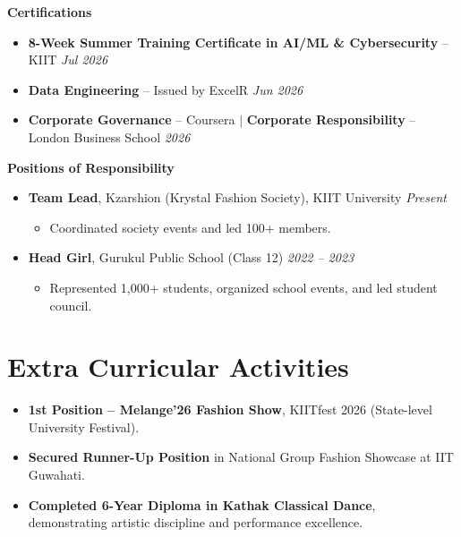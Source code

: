 \documentclass[a4paper,10pt]{article}
\begin{document}
\noindent\textbf{Certifications}
\begin{itemize}
    \item \textbf{8-Week Summer Training Certificate in AI/ML \& Cybersecurity} -- KIIT \hfill \textit{Jul 2026}
    \item \textbf{Data Engineering} -- Issued by ExcelR \hfill \textit{Jun 2026}
    \item \textbf{Corporate Governance} -- Coursera \quad $|$ \quad \textbf{Corporate Responsibility} -- London Business School \hfill \textit{2026}
\end{itemize}

\vspace{2pt}
\noindent\textbf{Positions of Responsibility}
\begin{itemize}
    \item \textbf{Team Lead}, Kzarshion (Krystal Fashion Society), KIIT University \hfill \textit{Present}
    \begin{itemize}[label=$\circ$, leftmargin=10pt, topsep=0pt, itemsep=0pt]
        \item Coordinated society events and led 100+ members.
    \end{itemize}
    \item \textbf{Head Girl}, Gurukul Public School (Class 12) \hfill \textit{2022 -- 2023}
    \begin{itemize}[label=$\circ$, leftmargin=10pt, topsep=0pt, itemsep=0pt]
        \item Represented 1,000+ students, organized school events, and led student council.
    \end{itemize}
\end{itemize}

\section{Extra Curricular Activities}
\begin{itemize}
    \item \textbf{1st Position -- Melange'26 Fashion Show}, KIITfest 2026 (State-level University Festival).
    \item \textbf{Secured Runner-Up Position} in National Group Fashion Showcase at IIT Guwahati.
    \item \textbf{Completed 6-Year Diploma in Kathak Classical Dance}, demonstrating artistic discipline and performance excellence.
\end{itemize}
\end{document}
